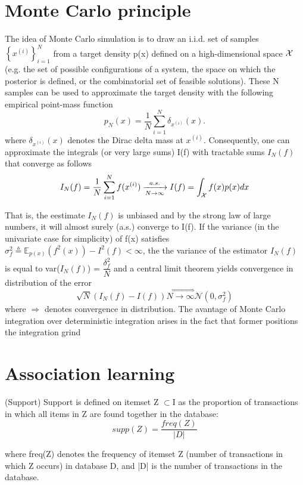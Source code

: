 \section{Monte Carlo principle}
The idea of Monte Carlo simulation is to draw an i.i.d. set of samples $\left\lbrace x^{(i)}\right\rbrace ^{N}_{i=1}
$ from a target density p(x) defined on a high-dimensional space $\mathcal{X}$ (e.g. the set of possible configurations
of a system, the space on which the posterior is defined, or the combinatorial set of feasible solutions).
These N samples can be used to approximate the target density with the following empirical point-mass function
\begin{equation*}
 p_N(x) = \dfrac{1}{N} \sum_{i=1}^{N} \delta_{x^{(i)}}(x).
\end{equation*}
where $\delta_{x^{(i)}}(x)$ denotes the Dirac delta mass at $x^{(i)}$.
Consequently, one can approximate the integrals (or very large sums) I(f) with tractable sums 
$I_{N}(f)$ that converge as follows 
\begin{equation*}
 I_N(f) = \dfrac{1}{N} \sum_{i=1}^{N} f(x^{(i)})\xrightarrow[N \rightarrow \infty]{a.s.}
 I(f) = \int_{\mathcal{X}} f(x) p(x) dx
\end{equation*}

That is, the eestimate $I_{N}(f)$ is unbiased and by the strong law of large numbers, it will almost
surely (a.s.) converge to I(f). If the variance (in the univariate case for simplicity) of f(x) satisfies
$\sigma_{f}^{2} \stackrel{\vartriangle}{=} \mathbb{E}_{p(x)} (f^{2} (x)) - I^{2}(f) \lt \infty $, the the variance
of the estimator $I_{N}(f)$ is equal to var($I_N(f)$) = $\dfrac{\delta^{2}_{f}}{N}$ and a central limit theorem
yields convergence in distribution of the error 
\begin{equation*}
 \sqrt{N}(I_{N}(f) - I(f)) \stackrel{\Longrightarrow}{N\rightarrow\infty} \mathcal{N}(0,\sigma_{f}^{2})
\end{equation*}
where $\Longrightarrow$ denotes convergence in distribution. The avantage of Monte Carlo integration over deterministic
integration arises in the fact that former positions the integration grind

\section{Association learning}
\begin{dfn} (Support) Support is defined on itemset Z $\subset$I as the proportion of transactions
in which all items in Z are found together in the database:
\begin{equation*}supp(Z) =\dfrac{freq(Z)}{|D|} \end{equation*} 

where freq(Z) denotes the frequency of itemset Z (number of transactions in which Z occurs)
in database D, and |D| is the number of transactions in the database.
\end{dfn}